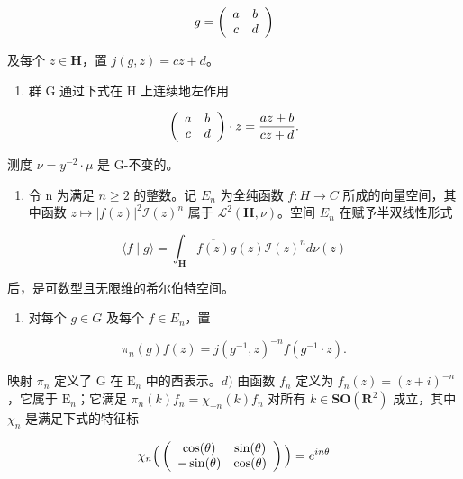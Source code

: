 \[
g = \left( \begin{array}{c c} a & b \\ c & d \end{array} \right)
\]

及每个 \(z \in \mathbf{H}\)，置 \(j(g, z) = cz + d\)。

\begin{enumerate}
\def\labelenumi{\alph{enumi})}
\tightlist
\item
  群 G 通过下式在 H 上连续地左作用
\end{enumerate}

\[
\left( \begin{array}{c c} a & b \\ c & d \end{array} \right) \cdot z = \frac {a z + b}{c z + d}.
\]

测度 \(\nu = y^{-2} \cdot \mu\) 是 G-不变的。

\begin{enumerate}
\def\labelenumi{\alph{enumi})}
\setcounter{enumi}{1}
\tightlist
\item
  令 n 为满足 \(n \geqslant 2\) 的整数。记 \(E_{n}\) 为全纯函数 \(f: H \to C\) 所成的向量空间，其中函数 \(z \mapsto |f(z)|^{2} \mathcal{I}(z)^{n}\) 属于 \(\mathcal{L}^{2}(\mathbf{H}, \nu)\)。空间 \(E_{n}\) 在赋予半双线性形式
\end{enumerate}

\[
\langle f \mid g \rangle = \int_ {\mathbf {H}} \overline {{f (z)}} g (z) \mathcal {I} (z) ^ {n} d \nu (z)
\]

后，是可数型且无限维的希尔伯特空间。

\begin{enumerate}
\def\labelenumi{\alph{enumi})}
\setcounter{enumi}{2}
\tightlist
\item
  对每个 \(g \in G\) 及每个 \(f \in E_{n}\)，置
\end{enumerate}

\[
\pi_ {n} (g) f (z) = j (g ^ {- 1}, z) ^ {- n} f (g ^ {- 1} \cdot z).
\]

映射 \(\pi_n\) 定义了 G 在 \(\mathrm{E}_n\) 中的酉表示。\(d)\) 由函数 \(f_n\) 定义为 \(f_n(z) = (z + i)^{-n}\)，它属于 \(\mathrm{E}_n\)；它满足 \(\pi_n(k)f_n = \chi_{-n}(k)f_n\) 对所有 \(k \in \mathbf{SO}(\mathbf{R}^2)\) 成立，其中 \(\chi_n\) 是满足下式的特征标

\[
\chi_ {n} \Big (\left( \begin{array}{c c} \cos (\theta) & \sin (\theta) \\ - \sin (\theta) & \cos (\theta) \end{array} \right) \Big) = e ^ {i n \theta}
\]

